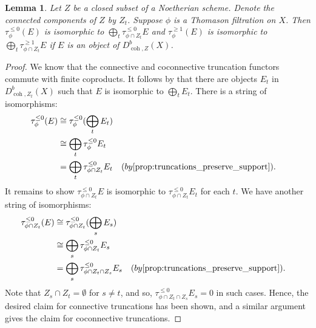 \documentclass[11pt]{amsart}
\theoremstyle{plain}
\newtheorem{lemma}[theorem]{Lemma}
\theoremstyle{definition}
\numberwithin{equation}{section}
\numberwithin{theorem}{section}
\begin{document}
\begin{lemma}\label{lem:splitting_for_truncations}
    Let $Z$ be a closed subset of a Noetherian scheme. Denote the connected components of $Z$ by $Z_t$. Suppose $\phi$ is a Thomason filtration on $X$. Then $\tau^{\leq 0}_\phi (E)$ is isomorphic to $\bigoplus_t \tau^{\leq 0}_{\phi\cap Z_t} E$ and $\tau^{\geq 1}_\phi (E)$ is isomorphic to $\bigoplus_t \tau^{\geq 1}_{\phi\cap Z_t} E$ if $E$ is an object of $D^b_{\operatorname{coh},Z}(X)$.
\end{lemma}

\begin{proof}
    We know that the connective and coconnective truncation functors commute with finite coproducts. It follows by \cite[Lemma 3.9]{Huybrechts:2006} that there are objects $E_t$ in $D^b_{\operatorname{coh},Z_t}(X)$ such that $E$ is isomorphic to $\bigoplus_t E_t$. There is a string of isomorphisms:
    \begin{displaymath}
        \begin{aligned}
            \tau^{\leq 0}_\phi (E) &\cong \tau^{\leq 0}_\phi (\bigoplus_t E_t) \\&\cong \bigoplus_t \tau^{\leq 0}_\phi E_t \\&= \bigoplus_t \tau^{\leq 0}_{\phi\cap Z_t} E_t && (\textrm{by \Cref{prop:truncations_preserve_support}}).
        \end{aligned}
    \end{displaymath} 
    It remains to show $\tau^{\leq 0}_{\phi\cap Z_t} E$ is isomorphic to $\tau^{\leq 0}_{\phi\cap Z_t} E_t$ for each $t$. We have another string of isomorphisms:
    \begin{displaymath}
        \begin{aligned}
            \tau^{\leq 0}_{\phi\cap Z_t} (E) &\cong \tau^{\leq 0}_{\phi\cap Z_t} (\bigoplus_s E_s) \\&\cong \bigoplus_s \tau^{\leq 0}_{\phi\cap Z_t} E_s \\&= \bigoplus_s \tau^{\leq 0}_{\phi\cap Z_t\cap Z_s} E_s && (\textrm{by \Cref{prop:truncations_preserve_support}}).
        \end{aligned}
    \end{displaymath}
    Note that $Z_s\cap Z_t=\emptyset$ for $s\not=t$, and so, $\tau^{\leq 0}_{\phi\cap Z_t\cap Z_s} E_s=0$ in such cases. Hence, the desired claim for connective truncations has been shown, and a similar argument gives the claim for coconnective truncations. 
\end{proof}
\end{document}
